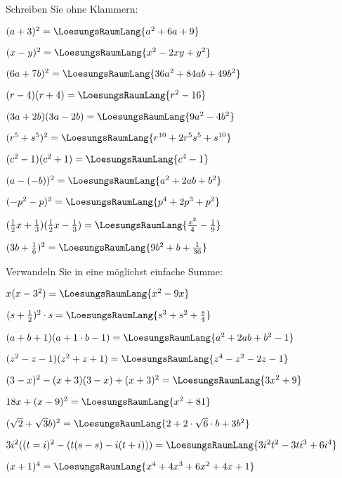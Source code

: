 
\renewcommand{\bbwAufgabenBlockID}{A1Bi}

\renewcommand{\metaHeaderLine}{Aufgabenblatt}
\renewcommand{\arbeitsblattTitel}{Binomische Formeln}


\arbeitsblattHeader{}

Schreiben Sie ohne Klammern:

\begin{bbwAufgabenBlock}
\item $(a+3)^2 = \LoesungsRaumLang{a^2+6a+9}$
\item $(x-y)^2 = \LoesungsRaumLang{x^2-2xy+y^2}$
\item $(6a+7b)^2 = \LoesungsRaumLang{36a^2+84ab+49b^2}$
\item $(r-4)(r+4) = \LoesungsRaumLang{r^2-16}$
\item $(3a+2b)(3a-2b) = \LoesungsRaumLang{9a^2-4b^2}$
\item $(r^5 + s^5)^2 = \LoesungsRaumLang{r^{10} + 2r^5s^5+s^{10}}$
\item $(c^2-1)(c^2+1) = \LoesungsRaumLang{c^4-1}$
\item $(a-(-b))^2 = \LoesungsRaumLang{a^2+2ab+b^2}$
\item $(-p^2-p)^2 = \LoesungsRaumLang{p^4+2p^3+p^2}$
\item $(\frac12x+\frac13)(\frac12x-\frac13)= \LoesungsRaumLang{\frac{x^2}4 - \frac19}$
\item $(3b+\frac16)^2 = \LoesungsRaumLang{9b^2+b+\frac1{36}}$
\end{bbwAufgabenBlock}

\platzFuerBerechnungenBisEndeSeite{}

Verwandeln Sie in eine möglichst einfache Summe:

\begin{bbwAufgabenBlock}
\item $x(x-3^2) = \LoesungsRaumLang{x^2-9x}$
\item $(s+\frac12)^2\cdot{}s = \LoesungsRaumLang{s^3+s^2+\frac{s}4}$
\item $(a+b+1)(a+1\cdot{}b-1) = \LoesungsRaumLang{a^2+2ab+b^2 - 1}$
\item $(z^2-z-1)(z^2+z+1) = \LoesungsRaumLang{z^4-z^2-2z-1}$
\item $(3-x)^2 - (x+3)(3-x)+(x+3)^2 = \LoesungsRaumLang{3x^2+9}$
\item $18x + (x-9)^2 = \LoesungsRaumLang{x^2 + 81}$
\item $(\sqrt{2} + \sqrt{3}b)^2 = \LoesungsRaumLang{2 +2\cdot{}\sqrt{6}\cdot{}b+3b^2}$
\item $3i^2((t=i)^2-(t(s-s)-i(t+i))) = \LoesungsRaumLang{3i^2t^2 - 3ti^3 + 6i^4}$
\item $(x+1)^4 = \LoesungsRaumLang{x^4+4x^3+6x^2+4x+1}$
\end{bbwAufgabenBlock}

\platzFuerBerechnungenBisEndeSeite{}


